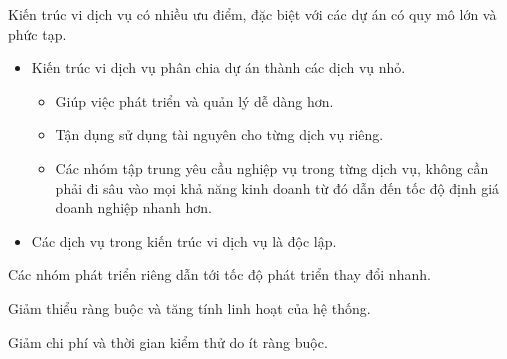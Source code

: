Kiến trúc vi dịch vụ có nhiều ưu điểm, đặc biệt với các dự án có quy mô lớn và phức tạp.

\begin{itemize}

    \item Kiến trúc vi dịch vụ phân chia dự án thành các dịch vụ nhỏ.

          \begin{itemize}

              \item Giúp việc phát triển và quản lý dễ dàng hơn.

              \item Tận dụng sử dụng tài nguyên cho từng dịch vụ riêng.


              \item Các nhóm tập trung yêu cầu nghiệp vụ trong từng dịch vụ, không cần phải đi sâu vào mọi khả năng kinh doanh từ đó dẫn đến tốc độ định giá doanh nghiệp nhanh hơn.

          \end{itemize}

    \item Các dịch vụ trong kiến trúc vi dịch vụ là độc lập.

\end{itemize}







Các nhóm phát triển riêng dẫn tới tốc độ phát triển thay đổi nhanh.

Giảm thiểu ràng buộc và tăng tính linh hoạt của hệ thống.

Giảm chi phí và thời gian kiểm thử do ít ràng buộc.

